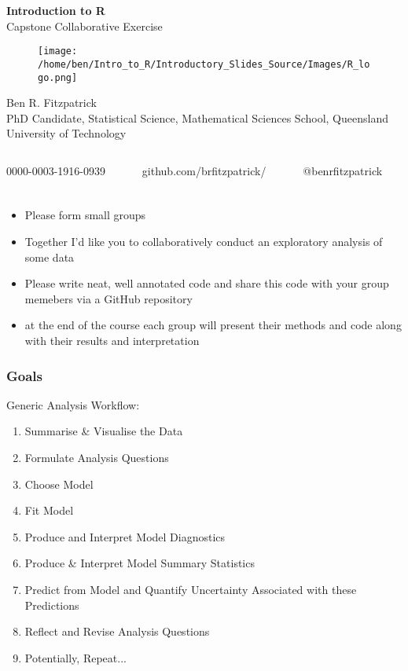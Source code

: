 \documentclass[xcolor=dvipsnames]{beamer}
\begin{document}
\begin{frame} %
\textbf{\huge Introduction to R}\\
Capstone Collaborative Exercise

\begin{figure}
\texttt{[image: /home/ben/Intro\_to\_R/Introductory\_Slides\_Source/Images/R\_logo.png]}
\end{figure}
\small Ben R. Fitzpatrick\\
\tiny PhD Candidate, Statistical Science, Mathematical Sciences School, Queensland University of Technology
\newline
\begin{columns}
\begin{column}{3cm}
\tiny 0000-0003-1916-0939
\end{column}
\begin{column}{3cm}
\tiny github.com/brfitzpatrick/
\end{column}
\begin{column}{3cm}
\tiny @benrfitzpatrick
\end{column}
\end{columns}
\end{frame}



\begin{frame} 
\frametitle{}
\begin{itemize}
\item Please form small groups
\item Together I'd like you to collaboratively conduct an exploratory analysis of some data
\item Please write neat, well annotated code and share this code with your group memebers via a GitHub repository
\item at the end of the course each group will present their methods and code along with their results and interpretation 
\end{itemize}
\end{frame}

\begin{frame}
\frametitle{Goals}
Generic Analysis Workflow:
\begin{enumerate}
\item Summarise \& Visualise the Data
\item Formulate Analysis Questions
\item Choose Model
\item Fit Model
\item Produce and Interpret Model Diagnostics
\item Produce \& Interpret Model Summary Statistics
\item Predict from Model and Quantify Uncertainty Associated with these Predictions
\item Reflect and Revise Analysis Questions
\item Potentially, Repeat...
\end{enumerate}
\end{frame}
\end{document}
